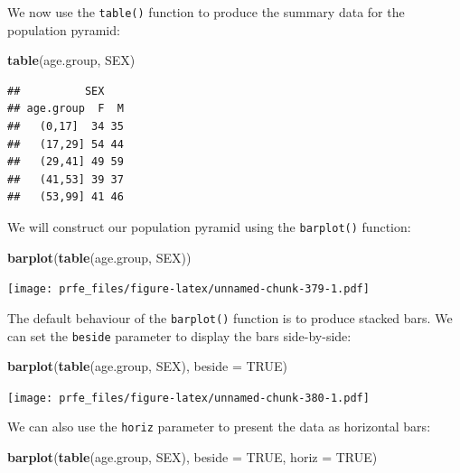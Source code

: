 \documentclass[12pt,a4paper]{book}
\newenvironment{Shaded}{\begin{snugshade}}{\end{snugshade}}
\newcommand{\DataTypeTok}[1]{\textcolor[rgb]{0.13,0.29,0.53}{#1}}
\newcommand{\KeywordTok}[1]{\textcolor[rgb]{0.13,0.29,0.53}{\textbf{#1}}}
\newcommand{\NormalTok}[1]{#1}
\newcommand{\OtherTok}[1]{\textcolor[rgb]{0.56,0.35,0.01}{#1}}
\theoremstyle{definition}
\theoremstyle{definition}
\theoremstyle{definition}
\theoremstyle{remark}
\begin{document}
We now use the \texttt{table()} function to produce the summary data for
the population pyramid:

\begin{Shaded}
\begin{Highlighting}[]
\KeywordTok{table}\NormalTok{(age.group, SEX)}
\end{Highlighting}
\end{Shaded}

\begin{verbatim}
##          SEX
## age.group  F  M
##   (0,17]  34 35
##   (17,29] 54 44
##   (29,41] 49 59
##   (41,53] 39 37
##   (53,99] 41 46
\end{verbatim}

We will construct our population pyramid using the \texttt{barplot()}
function:

\begin{Shaded}
\begin{Highlighting}[]
\KeywordTok{barplot}\NormalTok{(}\KeywordTok{table}\NormalTok{(age.group, SEX))}
\end{Highlighting}
\end{Shaded}

\texttt{[image: prfe\_files/figure-latex/unnamed-chunk-379-1.pdf]}

The default behaviour of the \texttt{barplot()} function is to produce
stacked bars. We can set the \texttt{beside} parameter to display the
bars side-by-side:

\begin{Shaded}
\begin{Highlighting}[]
\KeywordTok{barplot}\NormalTok{(}\KeywordTok{table}\NormalTok{(age.group, SEX), }\DataTypeTok{beside =} \OtherTok{TRUE}\NormalTok{)}
\end{Highlighting}
\end{Shaded}

\texttt{[image: prfe\_files/figure-latex/unnamed-chunk-380-1.pdf]}

We can also use the \texttt{horiz} parameter to present the data as
horizontal bars:

\begin{Shaded}
\begin{Highlighting}[]
\KeywordTok{barplot}\NormalTok{(}\KeywordTok{table}\NormalTok{(age.group, SEX), }\DataTypeTok{beside =} \OtherTok{TRUE}\NormalTok{, }\DataTypeTok{horiz =} \OtherTok{TRUE}\NormalTok{)}
\end{Highlighting}
\end{Shaded}
\end{document}
